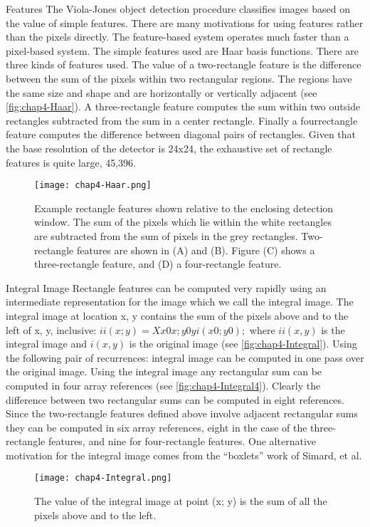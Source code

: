 \begin{compactitem}
\item {Features}
The Viola-Jones object detection procedure classifies images based on the value of simple features.
There are many motivations for using features rather than the pixels directly. The feature-based system
operates much faster than a pixel-based system.
The simple features used are Haar basis functions. There are three kinds of features used.
The value of a two-rectangle feature is the difference between the sum of the pixels within
two rectangular regions. The regions have the same size and shape and are horizontally
or vertically adjacent (see \autoref{fig:chap4-Haar}). A three-rectangle feature computes the sum within
two outside rectangles subtracted from the sum in a center rectangle. Finally a fourrectangle
feature computes the difference between diagonal pairs of rectangles.
Given that the base resolution of the detector is 24x24, the exhaustive set of rectangle
features is quite large, 45,396.

\begin{figure}[h]
  \centering
	\texttt{[image: chap4-Haar.png]}
  \caption{Example rectangle features shown relative to the enclosing detection window.
The sum of the pixels which lie within the white rectangles are subtracted from the
sum of pixels in the grey rectangles. Two-rectangle features are shown in (A) and (B).
Figure (C) shows a three-rectangle feature, and (D) a four-rectangle feature.}
  \label{fig:chap4-Haar}
\end{figure}

\item {Integral Image}
Rectangle features can be computed very rapidly using an intermediate representation
for the image which we call the integral image. The integral image at location x, y
contains the sum of the pixels above and to the left of x, y, inclusive:
$ii(x; y) = X x0x;y0yi(x0; y0);$
where $ii(x, y)$ is the integral image and $i(x, y)$ is the original image (see \autoref{fig:chap4-Integral}).
Using the following pair of recurrences:
integral image can be computed in one pass over the original image.
Using the integral image any rectangular sum can be computed in four array references
(see  \autoref{fig:chap4-Integral4}). Clearly the difference between two rectangular sums can be
computed in eight references. Since the two-rectangle features defined above involve
adjacent rectangular sums they can be computed in six array references, eight in the
case of the three-rectangle features, and nine for four-rectangle features.
One alternative motivation for the integral image comes from the “boxlets” work
of Simard, et al.
\begin{figure}[h]
  \centering
	\texttt{[image: chap4-Integral.png]}
  \caption{The value of the integral image at point (x; y) is the sum of all the pixels
above and to the left.}
  \label{fig:chap4-Integral}
\end{figure}


\end{compactitem}

